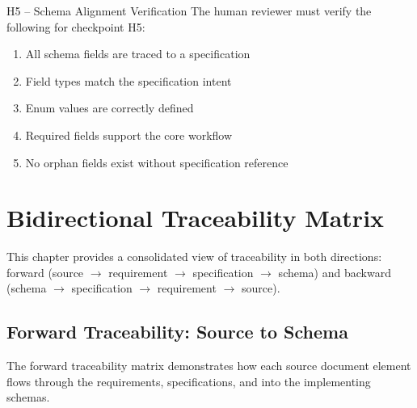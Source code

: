 \documentclass[11pt,a4paper,twoside]{report}
\begin{document}
\begin{hitlbox}{H5 -- Schema Alignment Verification}
The human reviewer must verify the following for checkpoint H5:
\begin{enumerate}[noitemsep]
\item All schema fields are traced to a specification
\item Field types match the specification intent
\item Enum values are correctly defined
\item Required fields support the core workflow
\item No orphan fields exist without specification reference
\end{enumerate}
\end{hitlbox}
\chapter{Bidirectional Traceability Matrix}
\label{ch:bidirectional-traceability}

This chapter provides a consolidated view of traceability in both directions:
forward (source $\rightarrow$ requirement $\rightarrow$ specification $\rightarrow$ schema)
and backward (schema $\rightarrow$ specification $\rightarrow$ requirement $\rightarrow$ source).

\section{Forward Traceability: Source to Schema}
\label{sec:forward-traceability}

The forward traceability matrix demonstrates how each source document
element flows through the requirements, specifications, and into the
implementing schemas.
\end{document}
